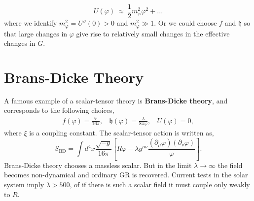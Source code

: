 \begin{equation}
    U(\varphi) \ \approx\  \frac{1}{2}m_{\varphi}^2\varphi^2 + ...
\end{equation}
where we identify $m_{\varphi}^2 = U''(0)>0$ and $m_{\varphi}^2\gg 1$. Or we could choose $f$ and $\mathfrak{h}$ so that large changes in $\varphi$ give rise to relatively small changes in the effective changes in $G$. 

\section{Brans-Dicke Theory}
A famous example of a scalar-tensor theory is \textbf{Brans-Dicke theory}, and corresponds to the following choices,
\begin{eqnarray}
    f(\varphi) = \frac{\varphi}{16\pi},\ \ \ \ \mathfrak{h}(\varphi) = \frac{\lambda}{8\pi\varphi},\ \ \ \ U(\varphi) = 0, 
\end{eqnarray}
where $\xi$ is a coupling constant. The scalar-tensor action is written as, 
\begin{equation}
    S_{\text{BD}} = \int d^4x\frac{\sqrt{-g}}{16\pi}\left[R\varphi -\lambda g^{\mu\nu}\frac{(\partial_{\mu}\varphi)(\partial_{\nu}\varphi)}{\varphi}\right].
\end{equation}
Brans-Dicke theory chooses a massless scalar. But in the limit $\lambda\rightarrow \infty$ the field becomes non-dynamical and ordinary GR is recovered. Current tests in the solar system imply $\lambda>500$, of if there is such a scalar field it must couple only weakly to $R$. 

